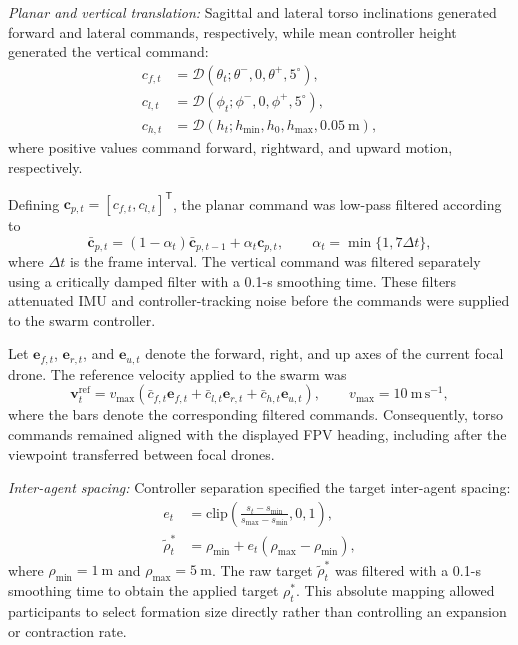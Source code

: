 \documentclass[conference, a4paper]{IEEEtran}
\begin{document}
\emph{Planar and vertical translation:}
Sagittal and lateral torso inclinations generated forward and lateral
commands, respectively, while mean controller height generated the vertical
command:
\begin{align}
c_{f,t} &=
\mathcal{D}(\theta_t;\theta^{-},0,\theta^{+},5^{\circ}),
\nonumber\\
c_{l,t} &=
\mathcal{D}(\phi_t;\phi^{-},0,\phi^{+},5^{\circ}),
\nonumber\\
c_{h,t} &=
\mathcal{D}(h_t;h_{\min},h_0,h_{\max},0.05~\mathrm{m}),
\label{eq:body_rate_commands}
\end{align}
where positive values command forward, rightward, and upward motion,
respectively.

Defining $\mathbf{c}_{p,t}=[c_{f,t},c_{l,t}]^{\mathsf T}$, the planar command
was low-pass filtered according to
\begin{equation}
\bar{\mathbf{c}}_{p,t}
=(1-\alpha_t)\bar{\mathbf{c}}_{p,t-1}
+\alpha_t\mathbf{c}_{p,t},
\qquad
\alpha_t=\min\{1,7\Delta t\},
\label{eq:torso_filter}
\end{equation}
where $\Delta t$ is the frame interval. The vertical command was filtered
separately using a critically damped filter with a 0.1-s smoothing time.
These filters attenuated IMU and controller-tracking noise before the
commands were supplied to the swarm controller.

Let $\mathbf{e}_{f,t}$, $\mathbf{e}_{r,t}$, and $\mathbf{e}_{u,t}$ denote the
forward, right, and up axes of the current focal drone. The reference velocity
applied to the swarm was
\begin{equation}
\mathbf{v}^{\mathrm{ref}}_t =
v_{\max}\left(
\bar c_{f,t}\mathbf{e}_{f,t}
+\bar c_{l,t}\mathbf{e}_{r,t}
+\bar c_{h,t}\mathbf{e}_{u,t}
\right),
\qquad
v_{\max}=10~\mathrm{m\,s^{-1}},
\label{eq:reference_velocity}
\end{equation}
where the bars denote the corresponding filtered commands. Consequently,
torso commands remained aligned with the displayed FPV heading, including
after the viewpoint transferred between focal drones.

\emph{Inter-agent spacing:}
Controller separation specified the target inter-agent spacing:
\begin{align}
e_t &=
\mathrm{clip}\!\left(
\frac{s_t-s_{\min}}{s_{\max}-s_{\min}},0,1\right),
\nonumber\\
\tilde{\rho}^{*}_t &=
\rho_{\min}+e_t(\rho_{\max}-\rho_{\min}),
\label{eq:spread_mapping}
\end{align}
where $\rho_{\min}=1~\mathrm{m}$ and $\rho_{\max}=5~\mathrm{m}$. The raw
target $\tilde{\rho}^{*}_t$ was filtered with a 0.1-s smoothing time to obtain
the applied target $\rho^{*}_t$. This absolute mapping allowed participants to
select formation size directly rather than controlling an expansion or
contraction rate.
\end{document}
